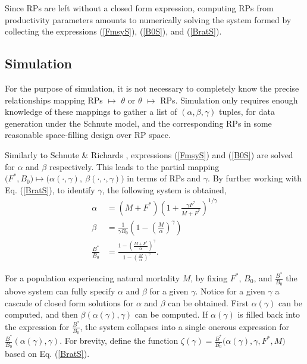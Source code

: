 %
Since RPs are left without a closed form expression, computing RPs from
productivity parameters amounts to numerically solving the system formed by collecting the
expressions (\ref{FmsyS}), (\ref{B0S}), and (\ref{BratS}).

%
\subsection{Simulation \label{sSim}}

%
For the purpose of simulation, it is not necessary to completely know
the precise relationships mapping RPs $\mapsto$ $\theta$ or $\theta$ $\mapsto$
RPs. Simulation only requires enough knowledge of these mappings to gather a list
of $(\alpha, \beta, \gamma)$ tuples, for data generation under the Schnute model,
and the corresponding RPs in some reasonable space-filling design over RP space.

%
Similarly to Schnute \& Richards \cite{schnute_analytical_1998}, expressions %
(\ref{FmsyS}) and (\ref{B0S}) are solved for $\alpha$ and $\beta$ respectively.
This leads to the partial mapping 
$\big(F^*, B_0\big) \mapsto \big(\alpha(\cdot, \gamma), ~\beta(\cdot, \cdot, \gamma)\big)$ 
in terms of RPs and $\gamma$. 
By further working with Eq. (\ref{BratS}), to identify $\gamma$, the following
system is obtained,
%
\begin{align}
\alpha &= (M+F^*)\left(1+\frac{\gamma F^*}{M+F^*}\right)^{1/\gamma} \nonumber\\
\beta &= \frac{1}{\gamma B_0}\left(1-\left(\frac{M}{\alpha}\right)^\gamma\right) \label{abgSys}\\
\frac{B^*}{B_0} &= \frac{1-\left(\frac{M+F^*}{\alpha}\right)^\gamma}{ 1-\left(\frac{M}{\alpha}\right)^\gamma } \nonumber.
\end{align}

%
For a population experiencing natural mortality $M$, by fixing $F^*$, 
$B_0$, and $\frac{B^*}{B_0}$ %
the above system can fully specify $\alpha$ and $\beta$ for a given $\gamma$. %
Notice for a given $\gamma$ a cascade of closed form solutions for $\alpha$
and $\beta$ can be obtained. First $\alpha(\gamma)$ can be computed, and then
$\beta(\alpha(\gamma), \gamma)$ can be computed. If $\alpha(\gamma)$ is filled
back into the expression for $\frac{B^*}{B_0}$, the system collapses into
a single onerous expression for $\frac{B^*}{B_0}(\alpha(\gamma), \gamma)$.
For brevity, define the function \mbox{$\zeta(\gamma)=\frac{B^*}{B_0}\big(\alpha(\gamma), \gamma, F^*, M\big)$} based on Eq. (\ref{BratS}). 

